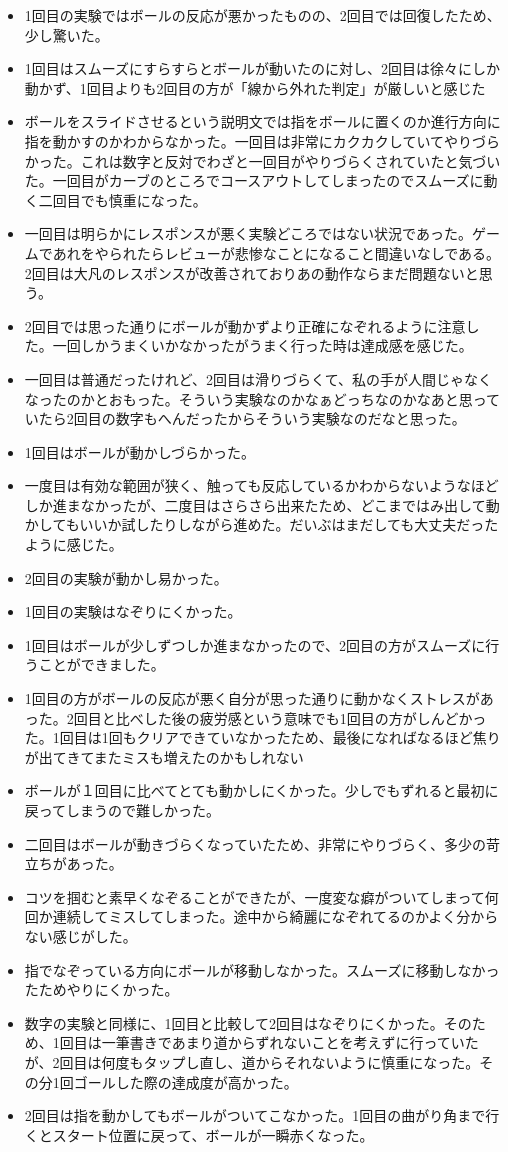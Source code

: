 \begin{itemize}
  \item 1回目の実験ではボールの反応が悪かったものの、2回目では回復したため、少し驚いた。
  \item 1回目はスムーズにすらすらとボールが動いたのに対し、2回目は徐々にしか動かず、1回目よりも2回目の方が「線から外れた判定」が厳しいと感じた
  \item ボールをスライドさせるという説明文では指をボールに置くのか進行方向に指を動かすのかわからなかった。一回目は非常にカクカクしていてやりづらかった。これは数字と反対でわざと一回目がやりづらくされていたと気づいた。一回目がカーブのところでコースアウトしてしまったのでスムーズに動く二回目でも慎重になった。
  \item 一回目は明らかにレスポンスが悪く実験どころではない状況であった。ゲームであれをやられたらレビューが悲惨なことになること間違いなしである。2回目は大凡のレスポンスが改善されておりあの動作ならまだ問題ないと思う。
  \item 2回目では思った通りにボールが動かずより正確になぞれるように注意した。一回しかうまくいかなかったがうまく行った時は達成感を感じた。
  \item 一回目は普通だったけれど、2回目は滑りづらくて、私の手が人間じゃなくなったのかとおもった。そういう実験なのかなぁどっちなのかなあと思っていたら2回目の数字もへんだったからそういう実験なのだなと思った。
  \item 1回目はボールが動かしづらかった。
  \item 一度目は有効な範囲が狭く、触っても反応しているかわからないようなほどしか進まなかったが、二度目はさらさら出来たため、どこまではみ出して動かしてもいいか試したりしながら進めた。だいぶはまだしても大丈夫だったように感じた。
  \item 2回目の実験が動かし易かった。
  \item 1回目の実験はなぞりにくかった。
  \item 1回目はボールが少しずつしか進まなかったので、2回目の方がスムーズに行うことができました。
  \item 1回目の方がボールの反応が悪く自分が思った通りに動かなくストレスがあった。2回目と比べした後の疲労感という意味でも1回目の方がしんどかった。1回目は1回もクリアできていなかったため、最後になればなるほど焦りが出てきてまたミスも増えたのかもしれない
  \item ボールが１回目に比べてとても動かしにくかった。少しでもずれると最初に戻ってしまうので難しかった。
  \item 二回目はボールが動きづらくなっていたため、非常にやりづらく、多少の苛立ちがあった。
  \item コツを掴むと素早くなぞることができたが、一度変な癖がついてしまって何回か連続してミスしてしまった。途中から綺麗になぞれてるのかよく分からない感じがした。
  \item 指でなぞっている方向にボールが移動しなかった。スムーズに移動しなかったためやりにくかった。
  \item 数字の実験と同様に、1回目と比較して2回目はなぞりにくかった。そのため、1回目は一筆書きであまり道からずれないことを考えずに行っていたが、2回目は何度もタップし直し、道からそれないように慎重になった。その分1回ゴールした際の達成度が高かった。
  \item 2回目は指を動かしてもボールがついてこなかった。1回目の曲がり角まで行くとスタート位置に戻って、ボールが一瞬赤くなった。
\end{itemize}